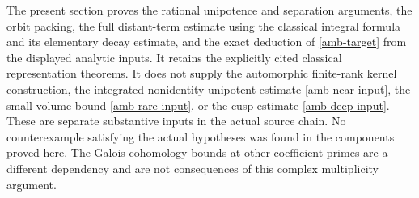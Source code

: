 The present section proves the rational unipotence and separation
arguments, the orbit packing, the full distant-term estimate
using the classical integral formula and its elementary
decay estimate, and the exact deduction
of \eqref{amb-target} from the displayed analytic inputs.
It retains the explicitly cited classical representation
theorems. It does not supply the automorphic
finite-rank kernel construction, the integrated nonidentity
unipotent estimate \eqref{amb-near-input}, the small-volume bound
\eqref{amb-rare-input}, or the cusp estimate
\eqref{amb-deep-input}. These are separate substantive inputs
in the actual source chain. No counterexample satisfying the
actual hypotheses was found in the components proved here.
The Galois-cohomology bounds at other coefficient primes are a
different dependency and are not consequences of this complex
multiplicity argument.


